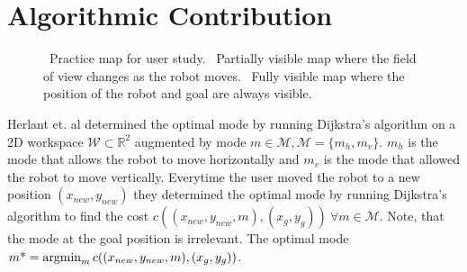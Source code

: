 \section{Algorithmic Contribution}
\label{sec:background}

\begin{figure}[t!]
    \centering
         \caption{\protect{}~Practice map for user study. \protect{}~Partially visible map where the field of view changes as the robot moves. \protect{}~Fully visible map where the position of the robot and goal are always visible.}
         \label{fig:maps}
\end{figure}

Herlant et. al determined the optimal mode by running Dijkstra's algorithm on a 2D workspace $\mathcal{W} \subset \mathbb{R}^2$ augmented by mode $m \in \mathcal{M}, \mathcal{M} = \{m_h, m_v\}$. $m_h$ is the mode that allows the robot to move horizontally and $m_v$ is the mode that allowed the robot to move vertically. Everytime the user moved the robot to a new position $(x_{new},y_{new})$ they determined the optimal mode by running Dijkstra's algorithm to find the cost $c((x_{new}, y_{new}, m),(x_g, y_g))~\forall m \in \mathcal{M}$. Note, that the mode at the goal position is irrelevant. The optimal mode $m\text{*} = \argmin_{m} c((x_{new}, y_{new}, m),(x_g, y_g))$.


